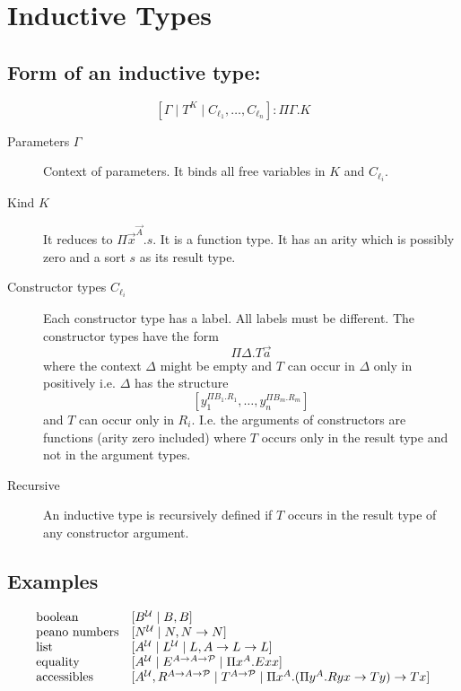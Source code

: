 \section {Inductive Types}


\subsection{Form of an inductive type:}
$$
    [\Gamma \mid T^K \mid C_{\ell_1}, \ldots, C_{\ell_n}] : \Pi \Gamma. K
$$

\begin{description}
    \item [Parameters $\Gamma$] Context of parameters. It binds all free
        variables in $K$ and $C_{\ell_i}$.

    \item [Kind $K$] It reduces to $\Pi \vec x^{\vec A}. s$. It is a function
        type. It has an arity which is possibly zero and a sort $s$ as its
        result type.

    \item [Constructor types $C_{\ell_i}$] Each constructor type has a label.
        All labels must be different. The constructor types have the form
        $$
            \Pi \Delta. T \vec a
        $$
        where the context $\Delta$ might be empty and $T$ can occur in $\Delta$
        only in positively i.e. $\Delta$ has the structure
        $$
            [y_1^{\Pi B_1. R_1}, \ldots, y_n^{\Pi B_m. R_m}]
        $$
        and $T$ can occur only in $R_i$. I.e. the arguments of constructors are
        functions (arity zero included) where $T$ occurs only in the result type
        and not in the argument types.

    \item [Recursive]
        An inductive type is recursively defined if $T$ occurs in the result
        type of any constructor argument.
\end{description}



\subsection{Examples}
$$
    \begin{array}{lll}
        \text{boolean}
        &
        [B^{\cal U} \mid B, B]
        \\
        \text{peano numbers}
        &
        [N^{\cal U} \mid N, N\to N]
        \\
        \text{list}
        &
        [A^{\cal U} \mid L^{\cal U} \mid L, A \to L\to L]
        \\
        \text{equality}
        &
        [A^{\cal U}
        \mid E^{A \to A \to {\cal P}}
        \mid \Pi x^A. E x x]
        \\
        \text{accessibles}
        &
        [
            A^{\cal U}, R^{A \to A \to {\cal P}}
            \mid
            T^{A \to {\cal P}}
            \mid
            \Pi x^A. (\Pi y^A. R y x \to T y) \to T x
        ]
    \end{array}
$$

